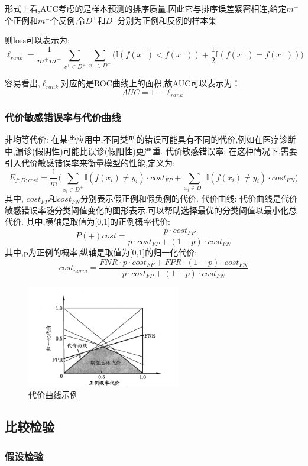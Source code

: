 形式上看,AUC考虑的是样本预测的排序质量,因此它与排序误差紧密相连,给定$m^+$个正例和$m^-$个反例,令$D^+$和$D^-$分别为正例和反例的样本集

则loss可以表示为:
\begin{equation}
    \ell_{rank} = \frac{1}{m^+ m^-} \sum_{x^+ \in D^+} \sum_{x^- \in D^-}\big( \mathbb{I}(f(x^+) <f(x^-))+\frac{1}{2}\mathbb{I}(f(x^+) = f(x^-))\big)
\end{equation}

容易看出,$\ell_{rank}$对应的是ROC曲线上的面积,故AUC可以表示为：
\begin{equation}
    AUC = 1 - \ell_{rank}
\end{equation}
\subsubsection{代价敏感错误率与代价曲线}
非均等代价: 在某些应用中,不同类型的错误可能具有不同的代价,例如在医疗诊断中,漏诊(假阴性)可能比误诊(假阳性)更严重.
代价敏感错误率: 在这种情况下,需要引入代价敏感错误率来衡量模型的性能,定义为:
\begin{equation}
    E_{f;D;cost} = \frac{1}{m} \big(\sum_{x_i \in D^+} \mathbb{I}(f(x_i) \neq y_i) \cdot cost_{FP} + \sum_{x_i \in D^-} \mathbb{I}(f(x_i) \neq y_i) \cdot cost_{FN}\big)
\end{equation}
其中, $cost_{FP}$和$cost_{FN}$分别表示假正例和假负例的代价.
代价曲线: 代价曲线是代价敏感错误率随分类阈值变化的图形表示,可以帮助选择最优的分类阈值以最小化总代价.
其中,横轴是取值为[0,1]的正例概率代价:
\begin{equation}
    P(+)cost=\frac{p \cdot cost_{FP}}{p \cdot cost_{FP} + (1-p) \cdot cost_{FN}}
\end{equation}
其中,p为正例的概率,纵轴是取值为[0,1]的归一化代价:
\begin{equation}
    cost_{norm}=\frac{FNR \cdot p \cdot cost_{FP} + FPR \cdot (1-p) \cdot cost_{FN}}{p \cdot cost_{FP} + (1-p) \cdot cost_{FN}}
\end{equation}
\begin{figure}[H]
    \centering
    \includegraphics[width=0.6\textwidth]{static/images/代价曲线与期望总体代价.png}
    \caption{代价曲线示例}
    \label{fig:cost_curve}
\end{figure}
\subsection{比较检验}
\subsubsection{假设检验}

